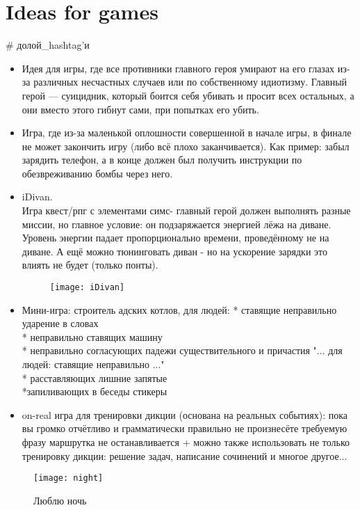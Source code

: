 \section{Ideas for games}
\begin{epigraph}
    \# долой_hashtag'и
\end{epigraph}

\begin{itemize}
\item Идея для игры, где все противники главного героя умирают на его глазах из-за различных несчастных случаев или по собственному идиотизму.
Главный герой --- суицидник, который боится себя убивать и просит всех остальных, а они вместо этого гибнут сами, при попытках его убить.
\item Игра, где из-за маленькой оплошности совершенной в начале игры, в финале не может закончить игру (либо всё плохо заканчивается).
Как пример: забыл зарядить телефон, а в конце должен был получить инструкции по обезвреживанию бомбы через него.
\item iDivan.\\
Игра квест/рпг с элементами симс- главный герой должен выполнять разные миссии, но главное условие: он подзаряжается энергией лёжа на диване.
Уровень энергии падает пропорционально времени, проведённому не на диване. А ещё можно тюнинговать диван - но на ускорение зарядки это влиять
не будет (только понты).

\begin{figure}[ht!]
        \centering
        \texttt{[image: iDivan]}
\end{figure}
\item Мини-игра: строитель адских котлов, для людей:
* ставящие неправильно ударение в словах\\
* неправильно ставящих машину\\
* неправильно согласующих падежи существительного и причастия "... для людей: ставящие неправильно ..."\\
* расставляющих лишние запятые\\
*запиливающих в беседы стикеры
\item on-real игра для тренировки дикции (основана на реальных событиях): пока вы громко отчётливо и грамматически правильно не произнесёте 
требуемую фразу маршрутка не останавливается + можно также использовать не только тренировку дикции: решение задач, написание сочинений 
и многое другое...
\end{itemize}
\begin{figure}[ht!]
    \centering
    \texttt{[image: night]}
    \caption{Люблю ночь}
\end{figure}
